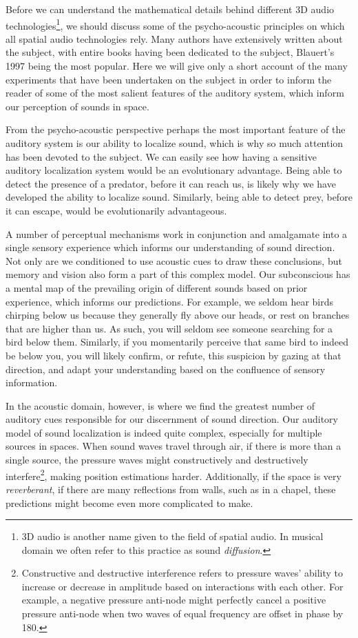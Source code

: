 Before we can understand the mathematical details behind different 3D audio technologies\footnote{3D audio is another name given to the field of spatial audio. In musical domain we often refer to this practice as sound \textit{diffusion}.}, we should discuss some of the psycho-acoustic principles on which all spatial audio technologies rely. Many authors have extensively written about the subject, with entire books having been dedicated to the subject, Blauert's 1997 \cite{blauert1997spatial} being the most popular. Here we will give only a short account of the many experiments that have been undertaken on the subject in order to inform the reader of some of the most salient features of the auditory system, which inform our perception of sounds in space.

From the psycho-acoustic perspective perhaps the most important feature of the auditory system is our ability to localize sound, which is why so much attention has been devoted to the subject. We can easily see how having a sensitive auditory localization system would be an evolutionary advantage. Being able to detect the presence of a predator, before it can reach us, is likely why we have developed the ability to localize sound. Similarly, being able to detect prey, before it can escape, would be evolutionarily advantageous.

A number of perceptual mechanisms work in conjunction and amalgamate into a single sensory experience which informs our understanding of sound direction. Not only are we conditioned to use acoustic cues to draw these conclusions, but memory and vision also form a part of this complex model. Our subconscious has a mental map of the prevailing origin of different sounds based on prior experience, which informs our predictions. For example, we seldom hear birds chirping below us because they generally fly above our heads, or rest on branches that are higher than us. As such, you will seldom see someone searching for a bird below them. Similarly, if you momentarily perceive that same bird to indeed be below you, you will likely confirm, or refute, this suspicion by gazing at that direction, and adapt your understanding based on the confluence of sensory information. 

In the acoustic domain, however, is where we find the greatest number of auditory cues responsible for our discernment of sound direction. Our auditory model of sound localization is indeed quite complex, especially for multiple sources in spaces. When sound waves travel through air, if there is more than a single source, the pressure waves might constructively and destructively interfere\footnote{Constructive and destructive interference refers to pressure waves' ability to increase or decrease in amplitude based on interactions with each other. For example, a negative pressure anti-node might perfectly cancel a positive pressure anti-node when two waves of equal frequency are offset in phase by 180\textdegree.}, making position estimations harder. Additionally, if the space is very \textit{reverberant}, if there are many reflections from walls, such as in a chapel, these predictions might become even more complicated to make.

